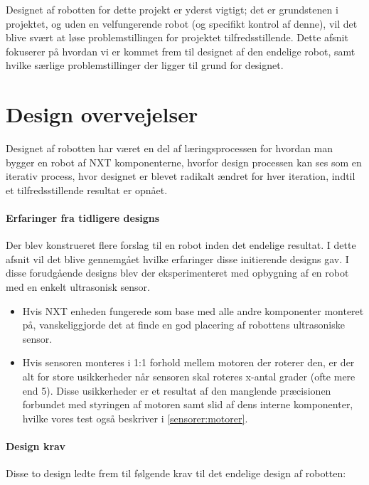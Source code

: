 Designet af robotten for dette projekt er yderst vigtigt; det er grundstenen i projektet, og uden en velfungerende robot (og specifikt kontrol af denne), vil det blive svært at løse problemstillingen for projektet tilfredsstillende.
Dette afsnit fokuserer på hvordan vi er kommet frem til designet af den endelige robot, samt hvilke særlige problemstillinger der ligger til grund for designet.

\section{Design overvejelser}\label{robot:design}
Designet af robotten har været en del af læringsprocessen for hvordan man bygger en robot af \lego NXT komponenterne, hvorfor design processen kan ses som en iterativ process, hvor designet er blevet radikalt ændret for hver iteration, indtil et tilfredsstillende resultat er opnået.


\paragraph{Erfaringer fra tidligere designs} 
Der blev konstrueret flere forslag til en robot inden det endelige resultat. 
I dette afsnit vil det blive gennemgået hvilke erfaringer disse initierende designs gav.
I disse forudgående designs blev der eksperimenteret med opbygning af en robot med en enkelt ultrasonisk sensor.

\begin{itemize}
\item Hvis NXT enheden fungerede som base med alle andre komponenter monteret på, vanskeliggjorde det at finde en god placering af robottens ultrasoniske sensor.

\item Hvis sensoren monteres i 1:1 forhold mellem motoren der roterer den, er der alt for store usikkerheder når sensoren skal roteres x-antal grader (ofte mere end 5\degree).
Disse usikkerheder er et resultat af den manglende præcisionen forbundet med styringen af motoren samt slid af dens interne komponenter, hvilke vores test også beskriver i \cref{sensorer:motorer}.
\end{itemize}

\paragraph{Design krav}
Disse to design ledte frem til følgende krav til det endelige design af robotten:

